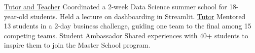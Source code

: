 
\begin{cvprojects}
  \cvproject
    {\href{https://www.linkedin.com/in/marcodifran/details/volunteering-experiences/}{Tutor and Teacher}}
    {Coordinated a 2-week Data Science summer school for 18-year-old students. Held a lecture on dashboarding in Streamlit.}
    {}
    {}
  \cvproject
    {\href{https://www.linkedin.com/in/marcodifran/details/volunteering-experiences/}{Tutor}}
    {Mentored 13 students in a 2-day business challenge, guiding one team to the final among 15 competing teams.}
    {}
    {}
  \cvproject
    {\href{https://www.linkedin.com/in/marcodifran/details/volunteering-experiences/}{Student Ambassador}}
    {Shared experiences with 40+ students to inspire them to join the Master School program.}
    {}
    {}
\end{cvprojects}
